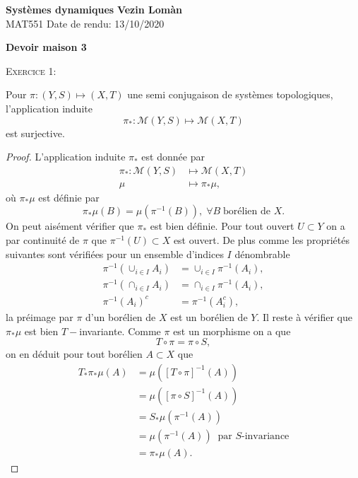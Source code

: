\documentclass[12pt]{article}
\newenvironment{ex}[1]
{\begin{mdframed}[linewidth=0.6pt]
        \textsc{Exercice #1:}

}
    {\end{mdframed}}
\begin{document}
        \noindent
\textbf{Systèmes dynamiques} \hfill \textbf{Vezin Lomàn}\\
\normalsize MAT551 \hfill Date de rendu: 13/10/2020\\

\begin{center}
\textbf{Devoir maison 3}
\end{center}
        
\begin{ex}{1}
        Pour $\pi : (Y, S) \longmapsto (X,T)$ une semi conjugaison de systèmes topologiques, l'application induite \[
                \pi_{*} : \mathcal{M}(Y, S) \longmapsto \mathcal{M}(X,T)
        \] est surjective.
\end{ex}

\begin{proof}
        L'application induite $\pi_{*}$ est donnée par
        \begin{align*}
                \pi_{*} : \mathcal{M}(Y,S) &\longmapsto \mathcal{M}(X,T) \\
                \mu &\longmapsto \pi_{*}\mu 
        ,\end{align*}
        où $\pi_{*}\mu$ est définie par \[
               \pi_{*}\mu(B) = \mu(\pi^{-1}(B)), \; \forall B \; \text{borélien de } X
        .\] 
        On peut aisément vérifier que $\pi_{*}$ est bien définie. Pour tout ouvert $U \subset Y$ on a par continuité de $\pi$ que $\pi^{-1}(U) \subset X$ est ouvert. De plus comme les propriétés suivantes sont vérifiées pour un ensemble d'indices $I$ dénombrable
        \begin{align*}
                \pi^{-1}(\cup_{i\in I}A_{i}) &= \cup_{i \in I}\pi^{-1}(A_{i}), \\
                \pi^{-1}(\cap_{i\in I}A_{i}) &= \cap_{i\in I}\pi^{-1}(A_{i}), \\
                \pi^{-1}(A_{i})^{c} &= \pi^{-1}(A_{i}^{c})
        ,\end{align*}
la préimage par $\pi$ d'un borélien de $X$ est un borélien de $Y$. Il reste à vérifier que $\pi_{*}\mu$ est bien $T-$invariante. Comme $\pi$ est un morphisme on a que \[
T\circ\pi = \pi\circ S
,\] on en déduit pour tout borélien $A \subset X$ que
\begin{align*}
        T_{*}\pi_{*}\mu(A) &= \mu([T\circ\pi]^{-1}(A)) \\
                           &= \mu([\pi\circ S]^{-1}(A)) \\
                           &= S_{*}\mu(\pi^{-1}(A)) \\
                           &= \mu(\pi^{-1}(A)) \; \; \text{par } S \text{-invariance} \\
                           &= \pi_{*}\mu(A)
.\end{align*}


\end{proof}
\end{document}
